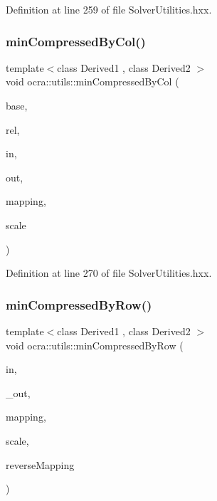 Definition at line 259 of file Solver\+Utilities.\+hxx.

\hypertarget{namespaceocra_1_1utils_aa4b4cd7a5d18ae426d5aa2fb46d20902}{}\label{namespaceocra_1_1utils_aa4b4cd7a5d18ae426d5aa2fb46d20902} 
\subsubsection{\texorpdfstring{min\+Compressed\+By\+Col()}{minCompressedByCol()}\hspace{0.1cm}{\footnotesize\ttfamily [2/2]}}
{\footnotesize\ttfamily template$<$class Derived1 , class Derived2 $>$ \\
void ocra\+::utils\+::min\+Compressed\+By\+Col (\begin{DoxyParamCaption}\item[{const \hyperlink{classocra_1_1Variable}{Variable} \&}]{base,  }\item[{const \hyperlink{classocra_1_1Variable}{Variable} \&}]{rel,  }\item[{const Matrix\+Base$<$ Derived1 $>$ \&}]{in,  }\item[{Matrix\+Base$<$ Derived2 $>$ const \&}]{out,  }\item[{std\+::vector$<$ int $>$ \&}]{mapping,  }\item[{double}]{scale }\end{DoxyParamCaption})\hspace{0.3cm}{\ttfamily [inline]}}



Definition at line 270 of file Solver\+Utilities.\+hxx.

\hypertarget{namespaceocra_1_1utils_ae8dc2eb14db238a75ea0a8bf499e4902}{}\label{namespaceocra_1_1utils_ae8dc2eb14db238a75ea0a8bf499e4902} 
\subsubsection{\texorpdfstring{min\+Compressed\+By\+Row()}{minCompressedByRow()}\hspace{0.1cm}{\footnotesize\ttfamily [1/2]}}
{\footnotesize\ttfamily template$<$class Derived1 , class Derived2 $>$ \\
void ocra\+::utils\+::min\+Compressed\+By\+Row (\begin{DoxyParamCaption}\item[{const Matrix\+Base$<$ Derived1 $>$ \&}]{in,  }\item[{Matrix\+Base$<$ Derived2 $>$ const \&}]{\+\_\+out,  }\item[{const std\+::vector$<$ int $>$ \&}]{mapping,  }\item[{double}]{scale,  }\item[{bool}]{reverse\+Mapping }\end{DoxyParamCaption})\hspace{0.3cm}{\ttfamily [inline]}}



